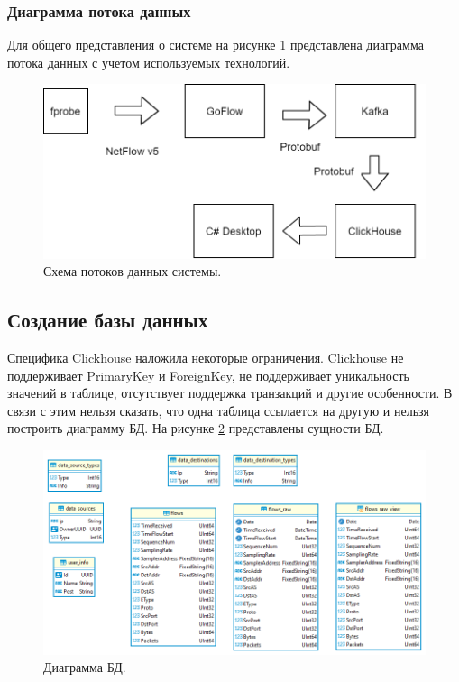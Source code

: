 \subsubsection{Диаграмма потока данных}
Для общего представления о системе на рисунке \ref{DataFlowEnd} представлена диаграмма потока данных с учетом используемых технологий.
\begin{figure}[H]
	\centering
	\includegraphics[scale=0.55]{concp.png}
	\caption{Схема потоков данных системы.}
	\label{DataFlowEnd}
\end{figure}

\subsection{Создание базы данных}

Специфика Clickhouse наложила некоторые ограничения. Clickhouse не поддерживает PrimaryKey и ForeignKey, не поддерживает уникальность значений в таблице, отсутствует поддержка транзакций и другие особенности\cite{clickhouse}. В связи с этим нельзя сказать, что одна таблица ссылается на другую и нельзя построить диаграмму БД. На рисунке \ref{img:DB} представлены сущности БД. \\
\begin{figure}[H]
	\centering
	\includegraphics[scale=0.55]{images/bd.png}
	\caption{Диаграмма БД.}
	\label{img:DB}
\end{figure}

